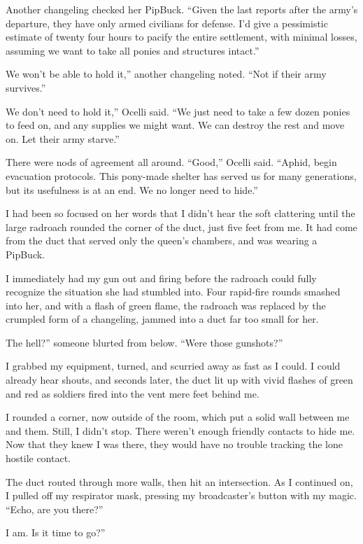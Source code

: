 Another changeling checked her PipBuck. “Given the last reports after the army’s departure, they have only armed civilians for defense. I’d give a pessimistic estimate of twenty four hours to pacify the entire settlement, with minimal losses, assuming we want to take all ponies and structures intact.”

\leavevmode{}We won’t be able to hold it,” another changeling noted. “Not if their army survives.”

\leavevmode{}We don’t need to hold it,” Ocelli said. “We just need to take a few dozen ponies to feed on, and any supplies we might want. We can destroy the rest and move on. Let their army starve.”

There were nods of agreement all around. “Good,” Ocelli said. “Aphid, begin evacuation protocols. This pony-made shelter has served us for many generations, but its usefulness is at an end. We no longer need to hide.”

I had been so focused on her words that I didn’t hear the soft clattering until the large radroach rounded the corner of the duct, just five feet from me. It had come from the duct that served only the queen’s chambers, and was wearing a PipBuck.

I immediately had my gun out and firing before the radroach could fully recognize the situation she had stumbled into. Four rapid-fire rounds smashed into her, and with a flash of green flame, the radroach was replaced by the crumpled form of a changeling, jammed into a duct far too small for her.

\leavevmode{}The hell?” someone blurted from below. “Were those gunshots?”

I grabbed my equipment, turned, and scurried away as fast as I could. I could already hear shouts, and seconds later, the duct lit up with vivid flashes of green and red as soldiers fired into the vent mere feet behind me.

I rounded a corner, now outside of the room, which put a solid wall between me and them. Still, I didn’t stop. There weren’t enough friendly contacts to hide me. Now that they knew I was there, they would have no trouble tracking the lone hostile contact.

The duct routed through more walls, then hit an intersection. As I continued on, I pulled off my respirator mask, pressing my broadcaster’s button with my magic. “Echo, are you there?”

\leavevmode{}I am. Is it time to go?”

